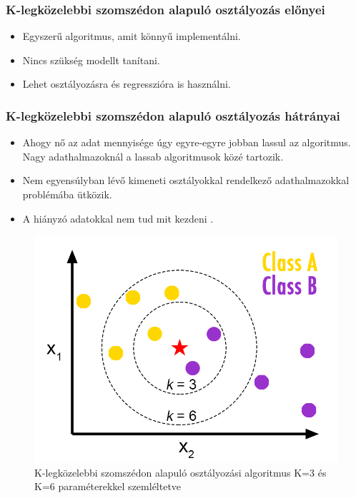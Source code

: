 \subsubsection{K-legközelebbi szomszédon alapuló osztályozás előnyei}
\begin{itemize}
    \item Egyszerű algoritmus, amit könnyű implementálni.
    \item Nincs szükség modellt tanítani.
    \item Lehet osztályozásra és regresszióra is használni.
\end{itemize}

\subsubsection{K-legközelebbi szomszédon alapuló osztályozás hátrányai}
\begin{itemize}
    \item Ahogy nő az adat mennyisége úgy egyre-egyre jobban lassul az algoritmus. Nagy adathalmazoknál a lassab algoritmusok közé tartozik.
    \item Nem egyensúlyban lévő kimeneti osztályokkal rendelkező adathalmazokkal problémába ütközik.
    \item A hiányzó adatokkal nem tud mit kezdeni \cite{k_legkozelebbi_1}.
\end{itemize}


\begin{figure}[h]
    \centering
    \includegraphics[scale=0.4]{images/3.fejezet/KNearestNeighbours.png}
    \caption{K-legközelebbi szomszédon alapuló osztályozási algoritmus K=3 és K=6 paraméterekkel szemléltetve \cite{klegkozelebbi_abra}}
    \label{fig:klegkozelebbi}
\end{figure}

